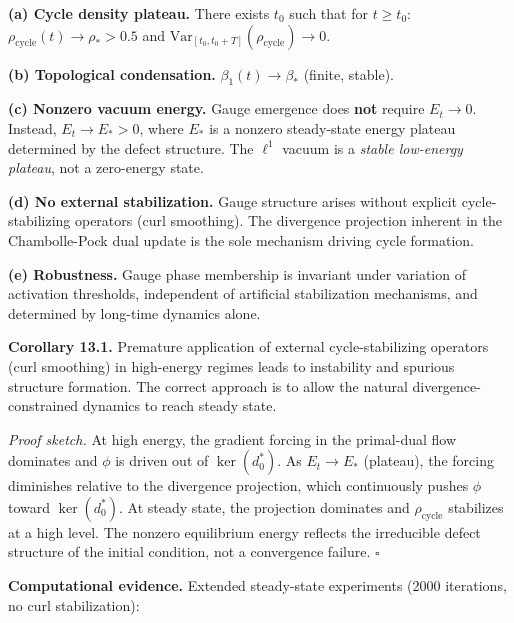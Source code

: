\documentclass[
]{article}
\begin{document}
\textbf{(a) Cycle density plateau.} There exists \(t_0\) such that for
\(t \geq t_0\): \(\rho_{\mathrm{cycle}}(t) \to \rho_* > 0.5\) and
\(\mathrm{Var}_{[t_0, t_0+T]}(\rho_{\mathrm{cycle}}) \to 0\).

\textbf{(b) Topological condensation.} \(\beta_1(t) \to \beta_*\)
(finite, stable).

\textbf{(c) Nonzero vacuum energy.} Gauge emergence does \textbf{not}
require \(E_t \to 0\). Instead, \(E_t \to E_* > 0\), where \(E_*\) is a
nonzero steady-state energy plateau determined by the defect structure.
The \(\ell^1\) vacuum is a \emph{stable low-energy plateau}, not a
zero-energy state.

\textbf{(d) No external stabilization.} Gauge structure arises without
explicit cycle-stabilizing operators (curl smoothing). The divergence
projection inherent in the Chambolle-Pock dual update is the sole
mechanism driving cycle formation.

\textbf{(e) Robustness.} Gauge phase membership is invariant under
variation of activation thresholds, independent of artificial
stabilization mechanisms, and determined by long-time dynamics alone.

\textbf{Corollary 13.1.} Premature application of external
cycle-stabilizing operators (curl smoothing) in high-energy regimes
leads to instability and spurious structure formation. The correct
approach is to allow the natural divergence-constrained dynamics to
reach steady state.

\emph{Proof sketch.} At high energy, the gradient forcing in the
primal-dual flow dominates and \(\phi\) is driven out of
\(\ker(d_0^*)\). As \(E_t \to E_*\) (plateau), the forcing diminishes
relative to the divergence projection, which continuously pushes
\(\phi\) toward \(\ker(d_0^*)\). At steady state, the projection
dominates and \(\rho_{\mathrm{cycle}}\) stabilizes at a high level. The
nonzero equilibrium energy reflects the irreducible defect structure of
the initial condition, not a convergence failure. \(\square\)

\textbf{Computational evidence.} Extended steady-state experiments (2000
iterations, no curl stabilization):
\end{document}
